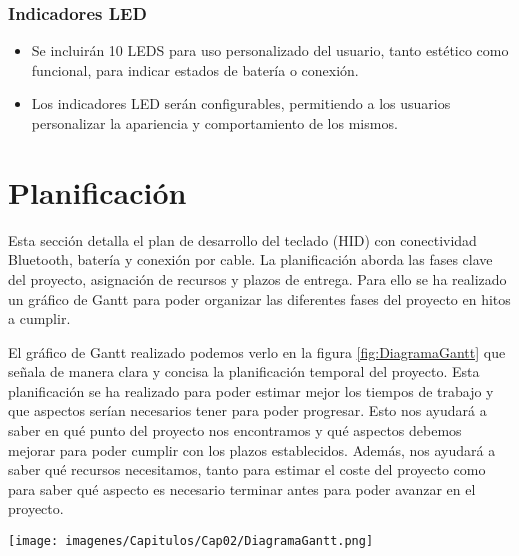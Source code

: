 \subsubsection{Indicadores \gls{LED}}
\begin{itemize}
\item Se incluirán 10 \gls{LED}S para uso personalizado del usuario, tanto estético como funcional, para indicar estados de batería o conexión.
\item Los indicadores \gls{LED} serán configurables, permitiendo a los usuarios personalizar la apariencia y comportamiento de los mismos.
\end{itemize}

\section{Planificación}

Esta sección detalla el plan de desarrollo del teclado (\gls{HID}) con conectividad \gls{Bluetooth}, batería y conexión por cable. La planificación aborda las fases clave del proyecto, asignación de recursos y plazos de entrega. Para ello se ha realizado un gráfico de Gantt para poder organizar las diferentes fases del proyecto en hitos a cumplir.

El gráfico de Gantt realizado podemos verlo en la figura \ref{fig:DiagramaGantt} que señala de manera clara y concisa la planificación temporal del proyecto. Esta planificación se ha realizado para poder estimar mejor los tiempos de trabajo y que aspectos serían necesarios tener para poder progresar. Esto nos ayudará a saber en qué punto del proyecto nos encontramos y qué aspectos debemos mejorar para poder cumplir con los plazos establecidos. Además, nos ayudará a saber qué recursos necesitamos, tanto para estimar el coste del proyecto como para saber qué aspecto es necesario terminar antes para poder avanzar en el proyecto.

\begin{sidewaysfigure}
\centering
\texttt{[image: imagenes/Capitulos/Cap02/DiagramaGantt.png]}
\caption{Planificación del proyecto con diagrama Gantt.}
\label{fig:DiagramaGantt}
\end{sidewaysfigure}
